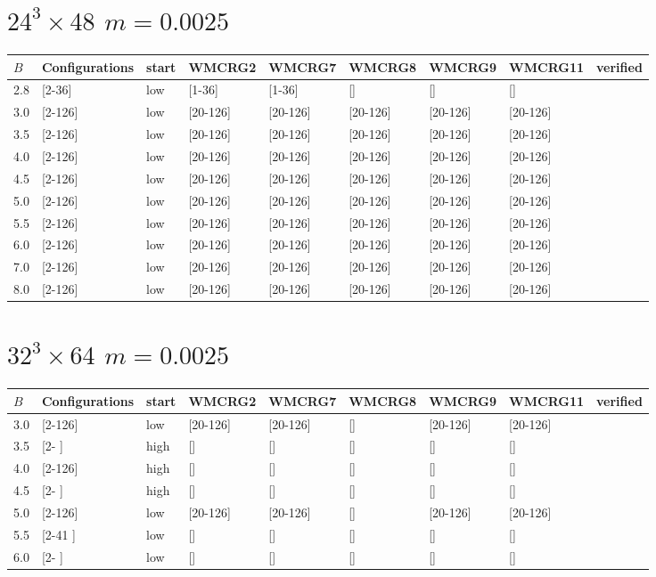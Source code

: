 \documentclass{article}
\begin{document}
  \section*{$24^3\times48$  $m=0.0025$}
    \begin{tabular}{| l | l | l | l | l | l | l | l | l |}
      \hline
      $B$ & Configurations & start & WMCRG2 & WMCRG7 & WMCRG8 & WMCRG9 & WMCRG11 & verified\\
      \hline
      2.8 & [2-36]  & low & [1-36]   & [1-36]   & [] & [] & [] &\\
      3.0 & [2-126] & low & [20-126] & [20-126] & [20-126] & [20-126] & [20-126] &\\
      3.5 & [2-126] & low & [20-126] & [20-126] & [20-126] & [20-126] & [20-126] &\\
      4.0 & [2-126] & low & [20-126] & [20-126] & [20-126] & [20-126] & [20-126] &\\
      4.5 & [2-126] & low & [20-126] & [20-126] & [20-126] & [20-126] & [20-126] &\\
      5.0 & [2-126] & low & [20-126] & [20-126] & [20-126] & [20-126] & [20-126] &\\
      5.5 & [2-126] & low & [20-126] & [20-126] & [20-126] & [20-126] & [20-126] &\\
      6.0 & [2-126] & low & [20-126] & [20-126] & [20-126] & [20-126] & [20-126] &\\
      7.0 & [2-126] & low & [20-126] & [20-126] & [20-126] & [20-126] & [20-126] &\\
      8.0 & [2-126] & low & [20-126] & [20-126] & [20-126] & [20-126] & [20-126] &\\
      \hline
    \end{tabular}
  \section*{$32^3\times64$  $m=0.0025$}
    \begin{tabular}{| l | l | l | l | l | l | l | l | l |}
      \hline
      $B$ & Configurations & start & WMCRG2 & WMCRG7 & WMCRG8 & WMCRG9 & WMCRG11 & verified\\
      \hline
      3.0 & [2-126] & low  & [20-126] & [20-126] & [] & [20-126] & [20-126] &\\
      3.5 & [2-   ] & high & [] & [] & [] & [] & [] &\\
      4.0 & [2-126] & high & [] & [] & [] & [] & [] &\\
      4.5 & [2-   ] & high & [] & [] & [] & [] & [] &\\
      5.0 & [2-126] & low  & [20-126] & [20-126] & [] & [20-126] & [20-126] &\\
      5.5 & [2-41 ] & low  & [] & [] & [] & [] & [] &\\
      6.0 & [2-   ] & low  & [] & [] & [] & [] & [] &\\
      \hline
    \end{tabular}
\end{document}
